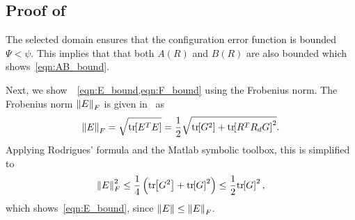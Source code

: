 \documentclass[letterpaper, 10 pt, conference]{ieeeconf}  %
\begin{document}
\subsection{Proof of~}\label{proof:eR_dot_bound}
	The selected domain ensures that the configuration error function is bounded \( \Psi < \psi \).
	This implies that that both \( A(R) \) and \( B(R) \) are also bounded which shows~\cref{eqn:AB_bound}.
	
	Next, we show~~\cref{eqn:E_bound,eqn:F_bound} using the Frobenius norm.
	The Frobenius norm \( \left\| E \right\|_F \) is given in~\cite{LeeITCST13} as
	\begin{gather*}
		\left\| E \right\|_F = \sqrt{\mathrm{tr}\negthickspace\left[ E^T E \right]} = \frac{1}{2} \sqrt{\mathrm{tr}\negthickspace\left[ G^2 \right] + \mathrm{tr}\negthickspace\left[ R^T R_d G \right]^2} .
	\end{gather*}
	Applying Rodrigues' formula and the Matlab symbolic toolbox, this is simplified to
	\begin{gather*}
		\left\| E \right\|^2_F \leq \frac{1}{4} \left( \mathrm{tr}\negthickspace\left[ G^2 \right] + \mathrm{tr}\negthickspace\left[ G \right]^2 \right) \leq \frac{1}{2} \mathrm{tr}\negthickspace\left[ G \right]^2 ,
	\end{gather*}
	which shows~\cref{eqn:E_bound}, since \( \left\| E \right\| \leq \left\| E \right\|_F \).
	
\end{document}
